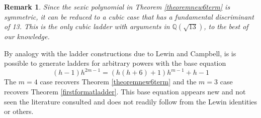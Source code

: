 \documentclass[12pt]{article}
\newtheorem{remark}{Remark}
\begin{document}
\begin{remark}
 Since the sexic polynomial in Theorem \ref{theoremnew6term} is symmetric, it can be reduced to a cubic case that has a fundamental 
 discriminant of 13. This is the only cubic ladder with arguments in $\mathbb{Q}(\sqrt{13})$, to the best of our knowledge. 
\end{remark}

 By analogy with the ladder constructions due to Lewin and Campbell, is is possible to generate ladders for arbitrary powers with the 
 base equation 
 \begin{equation*}
(h - 1) h^{2 m-1} = (h (h + 6) + 1) h^{m-1} +h - 1 
\end{equation*}
 The $m=4$ case recovers Theorem \ref{theoremnew6term} and the $m=3$ case recovers Theorem \ref{firstformatladder}. 
 This base equation appears new and not seen the literature consulted and does not readily follow from the Lewin identities or others. 
\end{document}
